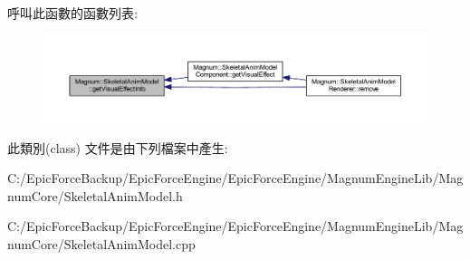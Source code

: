呼叫此函數的函數列表\+:\nopagebreak
\begin{figure}[H]
\begin{center}
\leavevmode
\includegraphics[width=350pt]{class_magnum_1_1_skeletal_anim_model_a347a76d9c59646ea702ecac3e1914deb_icgraph}
\end{center}
\end{figure}




此類別(class) 文件是由下列檔案中產生\+:\begin{DoxyCompactItemize}
\item 
C\+:/\+Epic\+Force\+Backup/\+Epic\+Force\+Engine/\+Epic\+Force\+Engine/\+Magnum\+Engine\+Lib/\+Magnum\+Core/Skeletal\+Anim\+Model.\+h\item 
C\+:/\+Epic\+Force\+Backup/\+Epic\+Force\+Engine/\+Epic\+Force\+Engine/\+Magnum\+Engine\+Lib/\+Magnum\+Core/Skeletal\+Anim\+Model.\+cpp\end{DoxyCompactItemize}
